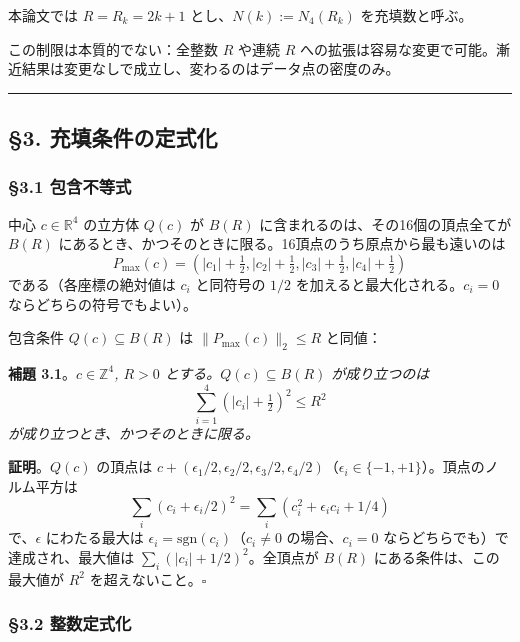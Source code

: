 \documentclass[a4paper,11pt]{ltjsarticle}
\theoremstyle{definition}
\begin{document}
本論文では \(R = R_k = 2k + 1\) とし、\(N(k) := N_4(R_k)\)
を充填数と呼ぶ。

この制限は本質的でない：全整数 \(R\) や連続 \(R\)
への拡張は容易な変更で可能。漸近結果は変更なしで成立し、変わるのはデータ点の密度のみ。

\begin{center}\rule{0.5\linewidth}{0.5pt}\end{center}

\subsection{§3.
充填条件の定式化}\label{ux5145ux586bux6761ux4ef6ux306eux5b9aux5f0fux5316}

\subsubsection{§3.1 包含不等式}\label{ux5305ux542bux4e0dux7b49ux5f0f}

中心 \(c \in \mathbb{R}^4\) の立方体 \(Q(c)\) が \(B(R)\)
に含まれるのは、その16個の頂点全てが \(B(R)\)
にあるとき、かつそのときに限る。16頂点のうち原点から最も遠いのは
\[P_{\max}(c) = (|c_1| + \tfrac{1}{2}, |c_2| + \tfrac{1}{2}, |c_3| + \tfrac{1}{2}, |c_4| + \tfrac{1}{2})\]
である（各座標の絶対値は \(c_i\) と同符号の \(1/2\)
を加えると最大化される。\(c_i = 0\) ならどちらの符号でもよい）。

包含条件 \(Q(c) \subseteq B(R)\) は \(\|P_{\max}(c)\|_2 \le R\) と同値：

\textbf{補題 3.1}。\emph{\(c \in \mathbb{Z}^4\), \(R > 0\)
とする。\(Q(c) \subseteq B(R)\) が成り立つのは}
\[\boxed{\;\sum_{i=1}^{4} (|c_i| + \tfrac{1}{2})^2 \le R^2\;}\]
\emph{が成り立つとき、かつそのときに限る。}

\textbf{証明}。\(Q(c)\) の頂点は
\(c + (\epsilon_1/2, \epsilon_2/2, \epsilon_3/2, \epsilon_4/2)\)（\(\epsilon_i \in \{-1, +1\}\)）。頂点のノルム平方は
\[\sum_i (c_i + \epsilon_i/2)^2 = \sum_i (c_i^2 + \epsilon_i c_i + 1/4)\]
で、\(\epsilon\) にわたる最大は
\(\epsilon_i = \mathrm{sgn}(c_i)\)（\(c_i \neq 0\) の場合、\(c_i = 0\)
ならどちらでも）で達成され、最大値は
\(\sum_i (|c_i| + 1/2)^2\)。全頂点が \(B(R)\) にある条件は、この最大値が
\(R^2\) を超えないこと。\(\square\)

\subsubsection{§3.2 整数定式化}\label{ux6574ux6570ux5b9aux5f0fux5316}
\end{document}
